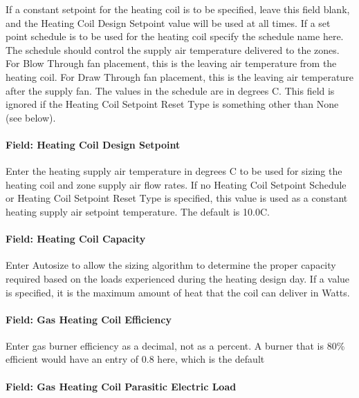If a constant setpoint for the heating coil is to be specified, leave this field blank, and the Heating Coil Design Setpoint value will be used at all times. If a set point schedule is to be used for the heating coil specify the schedule name here. The schedule should control the supply air temperature delivered to the zones. For Blow Through fan placement, this is the leaving air temperature from the heating coil. For Draw Through fan placement, this is the leaving air temperature after the supply fan. The values in the schedule are in degrees C. This field is ignored if the Heating Coil Setpoint Reset Type is something other than None (see below).

\paragraph{Field: Heating Coil Design Setpoint}\label{field-heating-coil-design-setpoint-2}

Enter the heating supply air temperature in degrees C to be used for sizing the heating coil and zone supply air flow rates. If no Heating Coil Setpoint Schedule or Heating Coil Setpoint Reset Type is specified, this value is used as a constant heating supply air setpoint temperature. The default is 10.0C.

\paragraph{Field: Heating Coil Capacity}\label{field-heating-coil-capacity-2}

Enter Autosize to allow the sizing algorithm to determine the proper capacity required based on the loads experienced during the heating design day. If a value is specified, it is the maximum amount of heat that the coil can deliver in Watts.

\paragraph{Field: Gas Heating Coil Efficiency}\label{field-gas-heating-coil-efficiency-4}

Enter gas burner efficiency as a decimal, not as a percent. A burner that is 80\% efficient would have an entry of 0.8 here, which is the default

\paragraph{Field: Gas Heating Coil Parasitic Electric Load}\label{field-gas-heating-coil-parasitic-electric-load-4}

